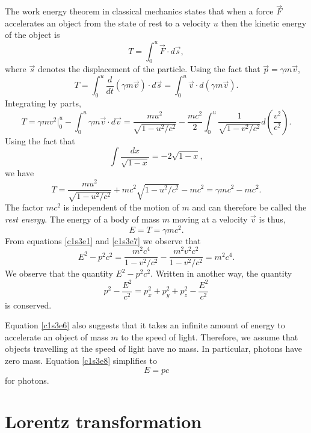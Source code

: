 The work energy theorem in classical mechanics states that when a force 
$\vec{F}$ accelerates an object from the state of rest to a velocity $u$ then
the kinetic energy of the object is
\begin{equation}\label{c1s3e5}
T = \int_0^u \vec{F}\cdot d\vec{s},
\end{equation}
where $\vec{s}$ denotes the displacement of the particle. Using the fact that
$\vec{p} = \gamma m\vec{v}$,
\[
T = \int_0^u \frac{d}{dt}(\gamma m\vec{v})\cdot d\vec{s} = 
\int_0^u \vec{v}\cdot d(\gamma m\vec{v}).
\]
Integrating by parts,
\[
T = \gamma mv^2\Big|_0^u - \int_0^u \gamma m\vec{v}\cdot d\vec{v} =
\frac{mu^2}{\sqrt{1 - u^2/c^2}} - \frac{mc^2}{2}\int_0^u 
\frac{1}{\sqrt{1 - v^2/c^2}}d\left(\frac{v^2}{c^2}\right).
\]
Using the fact that
\[
\int\frac{dx}{\sqrt{1 - x}} = -2\sqrt{1 - x},
\]
we have
\begin{equation}\label{c1s3e6}
T = \frac{mu^2}{\sqrt{1 - u^2/c^2}} + mc^2\sqrt{1 - u^2/c^2} - mc^2
= \gamma mc^2 - mc^2.
\end{equation}
The factor $mc^2$ is independent of the motion of $m$ and can therefore be
called the \emph{rest energy}. The energy of a body of mass $m$ moving at a 
velocity $\vec{v}$ is thus,
\begin{equation}\label{c1s3e7}
E = T = \gamma mc^2.
\end{equation}
From equations \eqref{c1s3e1} and \eqref{c1s3e7} we observe that
\begin{equation}\label{c1s3e8}
E^2 - p^2c^2 = \frac{m^2c^4}{1 - v^2/c^2} - \frac{m^2v^2c^2}{1 - v^2/c^2} = 
m^2c^4.
\end{equation}
We observe that the quantity $E^2 - p^2c^2$. Written in another way, the 
quantity
\begin{equation}\label{c1s3e9}
p^2 - \frac{E^2}{c^2} = p_x^2 + p_y^2 + p_z^2 - \frac{E^2}{c^2}
\end{equation}
is conserved.

Equation \eqref{c1s3e6} also suggests that it takes an infinite amount of
energy to accelerate an object of mass $m$ to the speed of light. Therefore,
we assume that objects travelling at the speed of light have no mass. In
particular, photons have zero mass. Equation \eqref{c1s3e8} simplifies to
\begin{equation}\label{c1s3e10}
E = pc
\end{equation}
for photons.

\section{Lorentz transformation}\label{c1s4}

